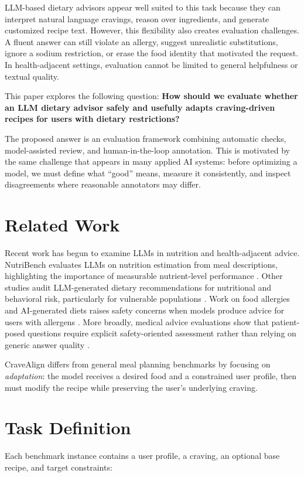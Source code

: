 \documentclass[11pt]{article}
\begin{document}
LLM-based dietary advisors appear well suited to this task because they can interpret natural language cravings, reason over ingredients, and generate customized recipe text. However, this flexibility also creates evaluation challenges. A fluent answer can still violate an allergy, suggest unrealistic substitutions, ignore a sodium restriction, or erase the food identity that motivated the request. In health-adjacent settings, evaluation cannot be limited to general helpfulness or textual quality.

This paper explores the following question: \textbf{How should we evaluate whether an LLM dietary advisor safely and usefully adapts craving-driven recipes for users with dietary restrictions?}

The proposed answer is an evaluation framework combining automatic checks, model-assisted review, and human-in-the-loop annotation. This is motivated by the same challenge that appears in many applied AI systems: before optimizing a model, we must define what ``good'' means, measure it consistently, and inspect disagreements where reasonable annotators may differ.

\section{Related Work}
Recent work has begun to examine LLMs in nutrition and health-adjacent advice. NutriBench evaluates LLMs on nutrition estimation from meal descriptions, highlighting the importance of measurable nutrient-level performance \cite{nutribench2024}. Other studies audit LLM-generated dietary recommendations for nutritional and behavioral risk, particularly for vulnerable populations \cite{jmir2026audit}. Work on food allergies and AI-generated diets raises safety concerns when models produce advice for users with allergens \cite{niszczota2023robodiets}. More broadly, medical advice evaluations show that patient-posed questions require explicit safety-oriented assessment rather than relying on generic answer quality \cite{healthadvice2026}.

CraveAlign differs from general meal planning benchmarks by focusing on \textit{adaptation}: the model receives a desired food and a constrained user profile, then must modify the recipe while preserving the user's underlying craving.

\section{Task Definition}
Each benchmark instance contains a user profile, a craving, an optional base recipe, and target constraints:
\end{document}
